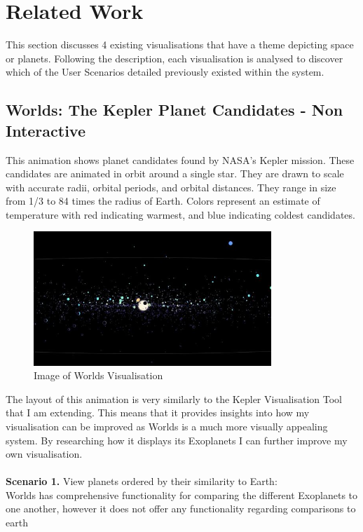 \chapter{Related Work} 
This section discusses 4 existing visualisations that have a theme depicting
space or planets. Following the description, each visualisation is analysed to
discover which of the User Scenarios detailed previously existed within the
system.

\section{Worlds: The Kepler Planet Candidates - Non Interactive}
 This animation \cite{worlds} shows  planet candidates found by NASA's Kepler
mission. These candidates are animated in orbit around a single star. They are
drawn to scale with accurate radii, orbital periods, and orbital distances. They
range in size from 1/3 to 84 times the radius of Earth. Colors represent an
estimate of temperature with red indicating warmest, and blue indicating coldest
candidates. 
\begin{figure}[H]
  \centering
      \includegraphics[width=0.8\textwidth]{images/worlds.jpg}
  \caption{Image of Worlds Visualisation}
\end{figure}
The layout of this animation is very similarly to the Kepler Visualisation Tool
that I am extending. This means that it provides insights into how my
visualisation can be improved as Worlds is a much more visually appealing
system. By researching how it displays its Exoplanets I can further improve my
own visualisation.
 \\\\
{\bf Scenario 1.} View planets ordered by their similarity to Earth:\\
Worlds has comprehensive functionality for comparing the different Exoplanets to
one another, however it does not offer any functionality regarding comparisons
to earth 
